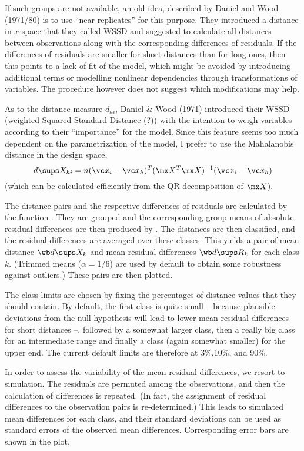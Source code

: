 \documentclass[11pt]{article}
\begin{document}
If such groups are not available, an old idea, described by
Daniel and Wood (1971/80) is to use ``near replicates'' for this purpose. 
They introduced a distance in $x$-space that they called WSSD and suggested
to calculate all distances between observations along with the
corresponding differences of residuals. If the differences of residuals
are smaller for short distances than for long ones, then this points to a
lack of fit of the model, which might be avoided by introducing 
additional terms or modelling nonlinear dependencies through
transformations of variables. The procedure however does not suggest
which modifications may help.

As to the distance measure $d_{hi}$, %
Daniel \& Wood (1971) introduced their 
WSSD (weighted Squared Standard Distance (?))
with the intention to weigh variables according to their ``importance'' for
the model. Since this feature seems too much dependent on the
parametrization of the model, I prefer to use the Mahalanobis distance in
the design space, 
$$
  d\sups X_{hi} = n(\vc x_i-\vc x_h)^T (\mx X^T\mx X)^{-1} (\vc x_i-\vc x_h)
$$
(which can be calculated efficiently from the QR decomposition of $\mx X$).

The distance pairs and the respective differences of residuals are
calculated by the function \Hneed{40mm}
. They are grouped and the
corresponding group means of absolute residual differences are then
produced by . 
The distances are then classified, and the residual differences
are averaged over these classes. This yields a pair of mean distance 
$\wb d\sups X_k$ and mean residual differences $\wb d\sups R_k$ 
for each class $k$. 
(Trimmed means ($\alpha=1/6$) are used by default to obtain some
robustness against outliers.)
These pairs are then plotted.

The class limits are chosen by fixing the percentages of distance values
that they should contain. By default, the first class is quite small -- 
because plausible deviations from the null hypothesis will lead to lower
mean residual differences for short distances --, followed by a somewhat
larger class, then a really big class for an intermediate range and finally
a class (again somewhat smaller) for the upper end. 
The current default limits are therefore at 3\%,10\%, and 90\%. 

In order to assess the variability of the mean residual differences,
we resort to simulation. The residuals are permuted among the observations,
and then the calculation of differences is repeated.
(In fact, the assignment of residual differences to the observation pairs 
is re-determined.) This leads to simulated mean differences for each class,
and their standard deviations can be used as standard errors of the 
observed mean differences. Corresponding error bars are shown in the
plot. 
\end{document}
